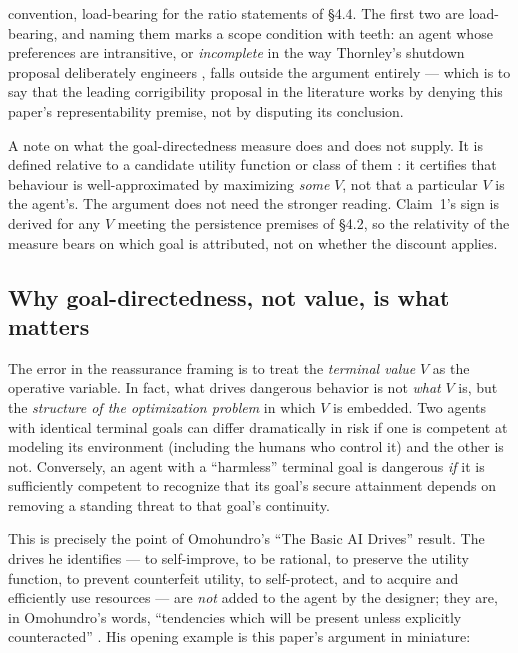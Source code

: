 \documentclass[11pt]{article}
\theoremstyle{definition}
\begin{document}
convention, load-bearing for the ratio statements of \S4.4. The first two are load-bearing, and naming them marks a scope condition with teeth: an agent whose preferences are intransitive, or \emph{incomplete} in the way Thornley's shutdown proposal deliberately engineers \cite{thornley2024incomplete}, falls outside the argument entirely --- which is to say that the leading corrigibility proposal in the literature works by denying this paper's representability premise, not by disputing its conclusion.

A note on what the goal-directedness measure does and does not supply. It is defined relative to a candidate utility function or class of them \cite{macdermott2024measuring}: it certifies that behaviour is well-approximated by maximizing \emph{some} $V$, not that a particular $V$ is the agent's. The argument does not need the stronger reading. Claim~1's sign is derived for any $V$ meeting the persistence premises of \S4.2, so the relativity of the measure bears on which goal is attributed, not on whether the discount applies.

\subsection{Why goal-directedness, not value, is what matters}

The error in the reassurance framing is to treat the \emph{terminal value} $V$ as the operative variable. In fact, what drives dangerous behavior is not \emph{what} $V$ is, but the \emph{structure of the optimization problem} in which $V$ is embedded. Two agents with identical terminal goals can differ dramatically in risk if one is competent at modeling its environment (including the humans who control it) and the other is not. Conversely, an agent with a ``harmless'' terminal goal is dangerous \emph{if} it is sufficiently competent to recognize that its goal's secure attainment depends on removing a standing threat to that goal's continuity.

This is precisely the point of Omohundro's ``The Basic AI Drives'' result. The drives he identifies --- to self-improve, to be rational, to preserve the utility function, to prevent counterfeit utility, to self-protect, and to acquire and efficiently use resources --- are \emph{not} added to the agent by the designer; they are, in Omohundro's words, ``tendencies which will be present unless explicitly counteracted'' \cite[p.~483]{omohundro2008drives}. His opening example is this paper's argument in miniature:
\end{document}
